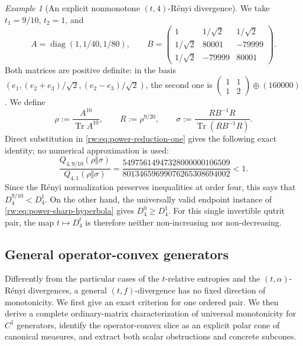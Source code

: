 \documentclass[11pt]{article}
\theoremstyle{remark}
\newtheorem{example}[example]{Example}
\newcommand{\1}{\mathbbm{1}}
\begin{document}
\begin{example}[An explicit nonmonotone $(t,4)$-R\'enyi divergence]
\label{rw:ex:explicit-alpha-four}
We take $t_1=9/10$, $t_2=1$, and
\begin{equation}
 A=\operatorname{diag}(1,1/40,1/80),\qquad
 B=\begin{pmatrix}
 1&1/\sqrt2&1/\sqrt2\\
 1/\sqrt2&80001&-79999\\
 1/\sqrt2&-79999&80001
 \end{pmatrix}.
\end{equation}
Both matrices are positive definite: in the basis
$(e_1,(e_2+e_3)/\sqrt2,(e_2-e_3)/\sqrt2)$, the second one is
$\left(\begin{smallmatrix}1&1\\1&2\end{smallmatrix}\right)
 \oplus(160000)$.  We define
\begin{equation}
 \rho:=\frac{A^{10}}{\operatorname{Tr} A^{10}},\qquad
 R:=\rho^{9/20},\qquad
 \sigma:=\frac{RB^{-1}R}{\operatorname{Tr}(RB^{-1}R)}.
\end{equation}
Direct substitution in \eqref{rw:eq:power-reduction-one} gives the
following exact identity; no numerical approximation is used:
\begin{equation}
 \frac{Q_{4,9/10}(\rho\Vert\sigma)}
      {Q_{4,1}(\rho\Vert\sigma)}
 =\frac{54975614947328000000106509}
 {80134659699076265308694002}<1.
 \label{rw:eq:explicit-alpha-four-ratio}
\end{equation}
Since the R\'enyi normalization preserves inequalities at order four,
this says that $D_4^{9/10}<D_4^1$.  On the other hand, the universally
valid endpoint instance of \eqref{rw:eq:power-sharp-hyperbola} gives
$D_4^0\geq D_4^1$.  For this single invertible qutrit pair, the map
$t\mapsto D_4^t$ is therefore neither non-increasing nor
non-decreasing.
\end{example}

\subsection{General operator-convex generators}
\label{rw:subsec:general-f-t-dependence}

Differently from the particular cases of the $t$-relative entropies
and the $(t,\alpha)$-R\'enyi divergences, a general $(t,f)$-divergence
has no fixed direction of monotonicity.  We first give an exact
criterion for one ordered pair.  We then derive a complete
ordinary-matrix characterization of universal monotonicity for
$C^1$ generators, identify
the operator-convex slice as an explicit polar cone of canonical
measures, and extract both scalar obstructions and concrete
subcones.
\end{document}
